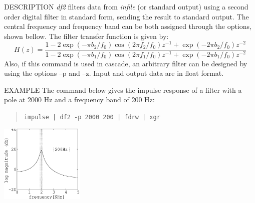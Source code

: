\begin{synopsis}
 \item[df2] [ --f $f_0$ ] [ --p $f_1 \; b_1$ ] [ --z $f_2 \; b_2$ ] 
            [ {\em infile} ]
\end{synopsis}

\begin{qsection}{DESCRIPTION}
{\em df2} filters data from {\em infile} (or standard output) 
using a second order digital filter in standard form, 
sending the result to standard output.
The central frequency and frequency band can
  be both assigned through the options, shown bellow.
  The filter transfer function is given by:
  \begin{displaymath}
   H(z)=\frac{1-2\exp(-\pi b_2/f_0)\cos(2\pi f_2/f_0)z^{-1} +
        \exp(-2\pi b_2/f_0)z^{-2}}
   {1-2\exp(-\pi b_1/f_0)\cos(2\pi f_1/f_0)z^{-1}+\exp(-2\pi b_1/f_0)z^{-2}}
  \end{displaymath}
 Also, if this command is used in cascade, an arbitrary filter can be
 designed by using the options --p and --z.
 Input and output data are in float format.
\end{qsection}

\begin{options}
\end{options} 

\begin{qsection}{EXAMPLE}
The command below gives the impulse response of a filter with
a pole at 2000 Hz and a frequency band of 200 Hz:
\begin{quote}
 \verb!impulse | df2 -p 2000 200 | fdrw | xgr !
\end{quote}
\hspace{3cm}
\includegraphics[width=4cm]{fig/df2.eps}
\end{qsection}
